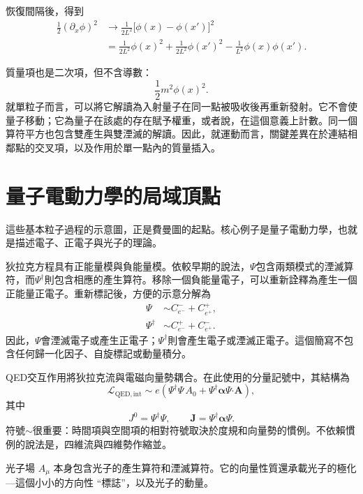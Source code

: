 恢復間隔後，得到
\begin{align}
\frac12(\partial_x\phi)^2
&\longrightarrow
\frac{1}{2L^2}\bigl[\phi(x)-\phi(x')\bigr]^2
\\
&=
\frac{1}{2L^2}\phi(x)^2
+\frac{1}{2L^2}\phi(x')^2
-\frac{1}{L^2}\phi(x)\phi(x').
\end{align}

質量項也是二次項，但不含導數：
\begin{equation}
\frac12m^2\phi(x)^2.
\end{equation}
就單粒子而言，可以將它解讀為入射量子在同一點被吸收後再重新發射。它不會使量子移動；它為量子在該處的存在賦予權重，或者說，在這個意義上計數。同一個算符平方也包含雙產生與雙湮滅的解讀。因此，就運動而言，關鍵差異在於連結相鄰點的交叉項，以及作用於單一點內的質量插入。

\section{量子電動力學的局域頂點}

這些基本粒子過程的示意圖，正是費曼圖的起點。核心例子是量子電動力學，也就是描述電子、正電子與光子的理論。

狄拉克方程具有正能量模與負能量模。依較早期的說法，\(\Psi\)包含兩類模式的湮滅算符，而\(\Psi^\dagger\)則包含相應的產生算符。移除一個負能量電子，可以重新詮釋為產生一個正能量正電子。重新標記後，方便的示意分解為
\begin{align}
\Psi
&\sim
C^-_{e^-}+C^+_{e^+},
\\
\Psi^\dagger
&\sim
C^+_{e^-}+C^-_{e^+}.
\end{align}
因此，\(\Psi\)會湮滅電子或產生正電子；\(\Psi^\dagger\)則會產生電子或湮滅正電子。這個簡寫不包含任何歸一化因子、自旋標記或動量積分。

QED交互作用將狄拉克流與電磁向量勢耦合。在此使用的分量記號中，其結構為
\begin{equation}
\mathcal L_{\mathrm{QED,int}}
\sim
e\left(
\Psi^\dagger\Psi\,A_0
+
\Psi^\dagger\boldsymbol{\alpha}\Psi\mathbin{\boldsymbol{\cdot}}\mathbf A
\right),
\end{equation}
其中
\begin{equation}
J^0=\Psi^\dagger\Psi,
\qquad
\mathbf J=\Psi^\dagger\boldsymbol{\alpha}\Psi.
\end{equation}
符號\(\sim\)很重要：時間項與空間項的相對符號取決於度規和向量勢的慣例。不依賴慣例的說法是，四維流與四維勢作縮並。

光子場 \(A_\mu\) 本身包含光子的產生算符和湮滅算符。它的向量性質還承載光子的極化---這個小小的方向性 ``標誌''，以及光子的動量。

